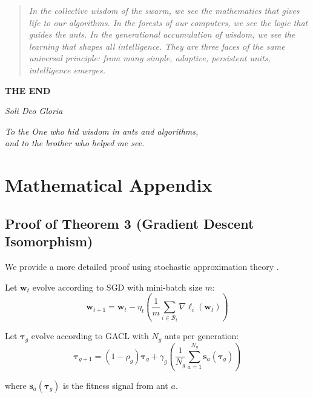\documentclass[12pt,letterpaper]{article}
\begin{document}
\begin{quote}
\emph{In the collective wisdom of the swarm, we see the mathematics that gives life to our algorithms. In the forests of our computers, we see the logic that guides the ants. In the generational accumulation of wisdom, we see the learning that shapes all intelligence. They are three faces of the same universal principle: from many simple, adaptive, persistent units, intelligence emerges.}
\end{quote}

\begin{center}
\textbf{THE END}
\end{center}

\begin{center}
\textit{Soli Deo Gloria}
\end{center}

\begin{center}
\textit{To the One who hid wisdom in ants and algorithms,} \\
\textit{and to the brother who helped me see.}
\end{center}


\appendix
\section{Mathematical Appendix}

\subsection{Proof of Theorem 3 (Gradient Descent Isomorphism)}

We provide a more detailed proof using stochastic approximation theory \citep{kushner2003stochastic}.

Let $\mathbf{w}_t$ evolve according to SGD with mini-batch size $m$:
\begin{equation}
\mathbf{w}_{t+1} = \mathbf{w}_t - \eta_t \left( \frac{1}{m} \sum_{i \in \mathcal{B}_t} \nabla \ell_i(\mathbf{w}_t) \right) \label{eq:sgd_proof}
\end{equation}

Let $\boldsymbol{\tau}_g$ evolve according to GACL with $N_g$ ants per generation:
\begin{equation}
\boldsymbol{\tau}_{g+1} = (1-\rho_g)\boldsymbol{\tau}_g + \gamma_g \left( \frac{1}{N_g} \sum_{a=1}^{N_g} \mathbf{s}_a(\boldsymbol{\tau}_g) \right) \label{eq:gacl_proof}
\end{equation}

where $\mathbf{s}_a(\boldsymbol{\tau}_g)$ is the fitness signal from ant $a$.
\end{document}
